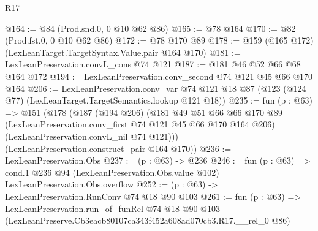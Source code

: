 \begin{lexlean}{R17}
\begin{coremodule}
@164 := @84 (Prod.snd.{0, 0} @10 @62 @86)
@165 := @78 @164
@170 := @82 (Prod.fst.{0, 0} @10 @62 @86)
@172 := @78 @170 @89
@178 := @159 (@165 @172) (LexLeanTarget.TargetSyntax.Value.pair @164 @170)
@181 := LexLeanPreservation.convL_cons @74 @121
@187 := @181 @46 @52 @66 @68 @164 @172
@194 := LexLeanPreservation.conv_second @74 @121 @45 @66 @170 @164
@206 := LexLeanPreservation.conv_var
    @74
    @121
    @18
    @87
    (@123 (@124 @77) (LexLeanTarget.TargetSemantics.lookup @121 @18))
@235 := fun (p : @63) =>
  @151
    (@178
      (@187
        (@194 @206)
        (@181
          @49
          @51
          @66
          @66
          @170
          @89
          (LexLeanPreservation.conv_first @74 @121 @45 @66 @170 @164 @206)
          (LexLeanPreservation.convL_nil @74 @121)))
      (LexLeanPreservation.construct_pair @164 @170))
@236 := LexLeanPreservation.Obs
@237 := (p : @63) -> @236
@246 := fun (p : @63) =>
  cond.{1} @236 @94 (LexLeanPreservation.Obs.value @102) LexLeanPreservation.Obs.overflow
@252 := (p : @63) -> LexLeanPreservation.RunConv @74 @18 @90 @103
@261 := fun (p : @63) =>
  LexLeanPreservation.run_of_funRel
    @74
    @18
    @90
    @103
    (LexLeanPreserve.Cb3eacb80107ca343f452a608ad070cb3.R17.__rel_0 @86)
\end{coremodule}
\end{lexlean}
